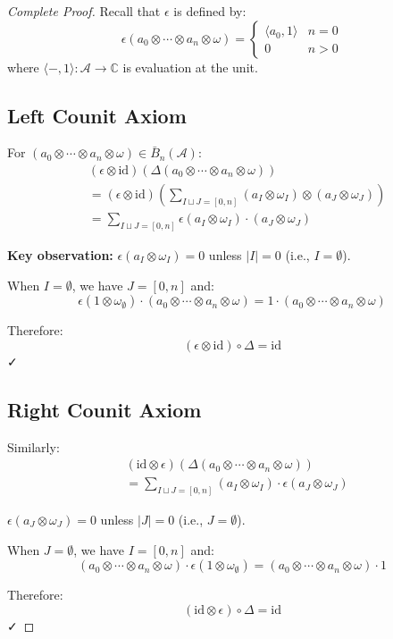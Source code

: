 \begin{proof}[Complete Proof]

Recall that $\epsilon$ is defined by:
$$\epsilon(a_0 \otimes \cdots \otimes a_n \otimes \omega) = 
\begin{cases}
\langle a_0, 1 \rangle & n = 0 \\
0 & n > 0
\end{cases}$$
where $\langle -, 1 \rangle: \mathcal{A} \to \mathbb{C}$ is evaluation at the unit.

\subsection*{Left Counit Axiom}

For $(a_0 \otimes \cdots \otimes a_n \otimes \omega) \in \bar{B}_n(\mathcal{A})$:
\begin{align*}
&(\epsilon \otimes \text{id})(\Delta(a_0 \otimes \cdots \otimes a_n \otimes \omega)) \\
&= (\epsilon \otimes \text{id})\left(\sum_{I \sqcup J = [0,n]} (a_I \otimes \omega_I) \otimes (a_J \otimes \omega_J)\right) \\
&= \sum_{I \sqcup J = [0,n]} \epsilon(a_I \otimes \omega_I) \cdot (a_J \otimes \omega_J)
\end{align*}

\textbf{Key observation:} $\epsilon(a_I \otimes \omega_I) = 0$ unless $|I| = 0$ (i.e., $I = \emptyset$).

When $I = \emptyset$, we have $J = [0,n]$ and:
$$\epsilon(1 \otimes \omega_{\emptyset}) \cdot (a_0 \otimes \cdots \otimes a_n \otimes \omega) = 1 \cdot (a_0 \otimes \cdots \otimes a_n \otimes \omega)$$

Therefore:
$$(\epsilon \otimes \text{id}) \circ \Delta = \text{id}$$ ✓

\subsection*{Right Counit Axiom}

Similarly:
\begin{align*}
&(\text{id} \otimes \epsilon)(\Delta(a_0 \otimes \cdots \otimes a_n \otimes \omega)) \\
&= \sum_{I \sqcup J = [0,n]} (a_I \otimes \omega_I) \cdot \epsilon(a_J \otimes \omega_J)
\end{align*}

$\epsilon(a_J \otimes \omega_J) = 0$ unless $|J| = 0$ (i.e., $J = \emptyset$).

When $J = \emptyset$, we have $I = [0,n]$ and:
$$(a_0 \otimes \cdots \otimes a_n \otimes \omega) \cdot \epsilon(1 \otimes \omega_{\emptyset}) = (a_0 \otimes \cdots \otimes a_n \otimes \omega) \cdot 1$$

Therefore:
$$(\text{id} \otimes \epsilon) \circ \Delta = \text{id}$$ ✓
\end{proof}

